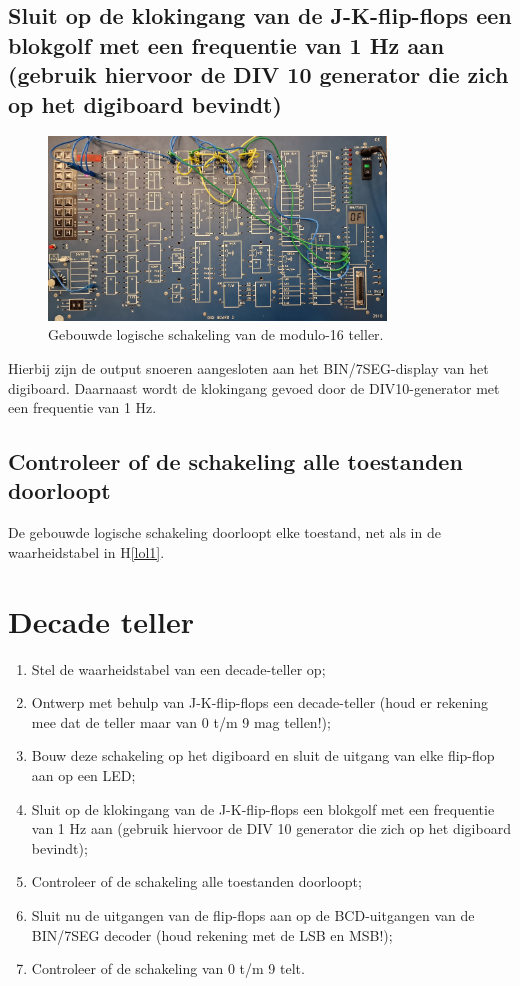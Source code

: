 \documentclass[12pt]{article}
\begin{document}
\subsection{Sluit op de klokingang van de J-K-flip-flops een blokgolf met een frequentie van 1 Hz aan (gebruik hiervoor de DIV 10 generator die zich op het digiboard bevindt)}
\begin{figure}[h]
    \centering
    \includegraphics[width=0.8\textwidth]{16SEG.jpg}
    \caption{Gebouwde logische schakeling van de modulo-16 teller.}
    \label{fig:16modg}
\end{figure}
Hierbij zijn de output snoeren aangesloten aan het BIN/7SEG-display van het digiboard. Daarnaast wordt de klokingang gevoed door de DIV10-generator met een frequentie van 1 Hz.
\subsection{Controleer of de schakeling alle toestanden doorloopt}
De gebouwde logische schakeling doorloopt elke toestand, net als in de waarheidstabel in H\ref{lol1}. 
\pagebreak
\section{Decade teller}
\begin{enumerate}
    \item Stel de waarheidstabel van een decade-teller op;
    \item Ontwerp met behulp van J-K-flip-flops een decade-teller (houd er rekening mee dat de teller maar van 0 t/m 9 mag tellen!);
    \item Bouw deze schakeling op het digiboard en sluit de uitgang van elke flip-flop aan op een LED;
    \item Sluit op de klokingang van de J-K-flip-flops een blokgolf met een frequentie van 1 Hz aan (gebruik hiervoor de DIV 10 generator die zich op het digiboard bevindt);
    \item Controleer of de schakeling alle toestanden doorloopt;
    \item Sluit nu de uitgangen van de flip-flops aan op de BCD-uitgangen van de BIN/7SEG decoder (houd rekening met de LSB en MSB!);
    \item Controleer of de schakeling van 0 t/m 9 telt.
\end{enumerate}
\pagebreak
\end{document}
